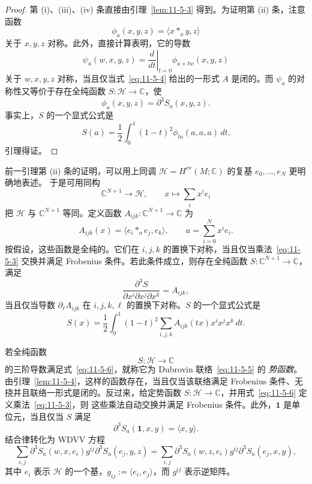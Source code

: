 \begin{proof}
第 (i)、(iii)、(iv) 条直接由引理~\ref{lem:11-5-3} 得到。为证明第 (ii) 条，注意函数
\[
  \phi_a(x,y,z)=\langle x*_a y,z\rangle
\]
关于 $x,y,z$ 对称。此外，直接计算表明，它的导数
\[
  \psi_a(w,x,y,z)
  =\left.\frac{d}{dt}\right|_{t=0}\phi_{a+tw}(x,y,z)
\]
关于 $w,x,y,z$ 对称，当且仅当式~\eqref{eq:11-5-4} 给出的一形式 $A$ 是闭的。而
$\psi_a$ 的对称性又等价于存在全纯函数 $S:\mathcal H\to\mathbb C$，使
\[
  \phi_a(x,y,z)=\partial^3S_a(x,y,z).
\]
事实上，$S$ 的一个显式公式是
\[
  S(a)=\frac12\int_0^1(1-t)^2\phi_{ta}(a,a,a)\,dt.
\]
引理得证。
\end{proof}
\begin{remark}\label{rem:11-5-5}
前一引理第 (ii) 条的证明，可以用上同调
$\mathcal H=H^{\mathrm{ev}}(M;\mathbb C)$ 的复基 $e_0,\ldots,e_N$ 更明确地表述。
于是可用同构
\[
  \mathbb C^{N+1}\longrightarrow\mathcal H,
  \qquad x\longmapsto\sum_i x^i e_i
\]
把 $\mathcal H$ 与 $\mathbb C^{N+1}$ 等同。定义函数
$A_{ijk}:\mathbb C^{N+1}\to\mathbb C$ 为
\[
  A_{ijk}(x)=\langle e_i*_a e_j,e_k\rangle,
  \qquad a=\sum_{i=0}^N x^i e_i.
\]
按假设，这些函数是全纯的。它们在 $i,j,k$ 的置换下对称，当且仅当乘法~\eqref{eq:11-5-3}
交换并满足 Frobenius 条件。若此条件成立，则存在全纯函数
$S:\mathbb C^{N+1}\to\mathbb C$，满足
\[
  \frac{\partial^3S}{\partial x^i\partial x^j\partial x^k}=A_{ijk},
\]
当且仅当导数 $\partial_\ell A_{ijk}$ 在 $i,j,k,\ell$ 的置换下对称。$S$ 的一个显式公式是
\[
  S(x)=\frac12\int_0^1(1-t)^2
  \sum_{i,j,k}A_{ijk}(tx)x^ix^jx^k\,dt.
\]
\end{remark}

若全纯函数
\[
  S:\mathcal H\longrightarrow\mathbb C
\]
的三阶导数满足式~\eqref{eq:11-5-6}，就称它为 Dubrovin 联络~\eqref{eq:11-5-5} 的
\emph{势函数}。由引理~\ref{lem:11-5-4}，这样的函数存在，当且仅当该联络满足 Frobenius
条件、无挠并且联络一形式是闭的。反过来，给定势函数
$S:\mathcal H\to\mathbb C$，并用式~\eqref{eq:11-5-6} 定义乘法~\eqref{eq:11-5-3}，则
这些乘法自动交换并满足 Frobenius 条件。此外，$\mathbf1$ 是单位元，当且仅当 $S$ 满足
\begin{equation}\label{eq:11-5-7}
  \partial^3S_a(\mathbf1,x,y)=\langle x,y\rangle.
\end{equation}
结合律转化为 WDVV 方程
\begin{equation}\label{eq:11-5-8}
  \sum_{i,j}\partial^3S_a(w,x,e_i)g^{ij}
  \partial^3S_a(e_j,y,z)
  =
  \sum_{i,j}\partial^3S_a(w,z,e_i)g^{ij}
  \partial^3S_a(e_j,x,y),
\end{equation}
其中 $e_i$ 表示 $\mathcal H$ 的一个基，$g_{ij}:=\langle e_i,e_j\rangle$，而
$g^{ij}$ 表示逆矩阵。

